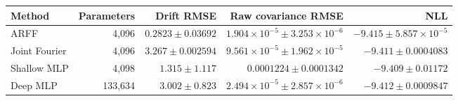 \begin{tabular}{lrrrr}\toprule Method & Parameters & Drift RMSE & Raw covariance RMSE & NLL\\\midrule
ARFF & 4,096 & $0.2823\pm 0.03692$ & $1.904\times10^{-5}\pm 3.253\times10^{-6}$ & $-9.415\pm 5.857\times10^{-5}$\\
Joint Fourier & 4,096 & $3.267\pm 0.002594$ & $9.561\times10^{-5}\pm 1.962\times10^{-5}$ & $-9.411\pm 0.0004083$\\
Shallow MLP & 4,098 & $1.315\pm 1.117$ & $0.0001224\pm 0.0001342$ & $-9.409\pm 0.01172$\\
Deep MLP & 133,634 & $3.002\pm 0.823$ & $2.494\times10^{-5}\pm 2.857\times10^{-6}$ & $-9.412\pm 0.0009847$\\
\bottomrule\end{tabular}
